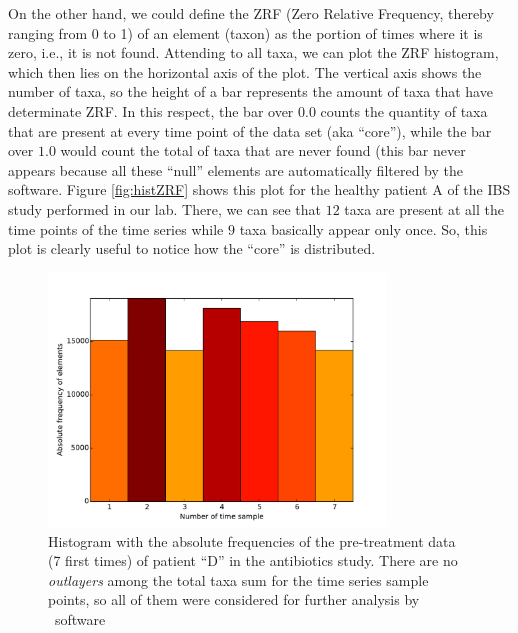 On the other hand, we could define the ZRF (Zero Relative Frequency, thereby ranging from 0 to 1) of an element (taxon) as the portion of times where it is zero, i.e., it is not found. Attending to all taxa, we can plot the ZRF histogram, which then lies on the horizontal axis of the plot. The vertical axis shows the number of taxa, so the height of a bar represents the amount of taxa that have determinate ZRF. In this respect, the bar over $0.0$ counts the quantity of taxa that are present at every time point of the data set (aka ``core''), while the bar over $1.0$ would count the total of taxa that are never found (this bar never appears because all these ``null'' elements are automatically filtered by the software. Figure \ref{fig:histZRF} shows this plot for the healthy patient A of the IBS study performed in our lab\cite{IBS}. There, we can see that $12$ taxa are present at all the time points of the time series while $9$ taxa basically appear only once. So, this plot is clearly useful to notice how the ``core'' is distributed.
	
\begin{figure}		
	\centering		
 	\includegraphics[width=0.8\textwidth]{results/hist/antibiotics_h_patD_pre_AbsFreqPlot}		
 	\caption{Histogram with the absolute frequencies of the pre-treatment data (7 first times) of patient ``D'' in the antibiotics study\cite{antibiotic}. There are no \emph{outlayers} among the total taxa sum for the time series sample points, so all of them were considered for further analysis by \CC\ software}		
 	\label{fig:histAFP}		
\end{figure}

